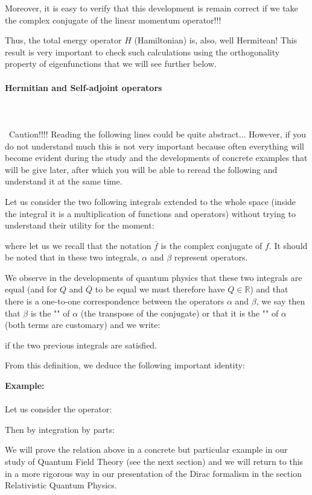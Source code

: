 	Moreover, it is easy to verify that this development is remain correct if we take the complex conjugate of the linear momentum operator!!!

	Thus, the total energy operator $H$ (Hamiltonian) is, also, well Hermitean! This result is very important to check such calculations using the orthogonality property of eigenfunctions that we will see further below.
	
	\paragraph{Hermitian and Self-adjoint operators}\mbox{}\\\\\
	Caution!!!! Reading the following lines could be quite abstract... However, if you do not understand much this is not very important because often everything will become evident during the study and the developments of concrete examples that will be give later, after which you will be able to reread the following and understand it at the same time.
	
	Let us consider the two following integrals extended to the whole space (inside the integral it is a multiplication of functions and operators) without trying to understand their utility for the moment:
	
	where let us we recall that the notation $\bar{f}$ is the complex conjugate of $f$. It should be noted that in these two integrals, $\alpha$ and $\beta$ represent operators.
	
	We observe in the developments of quantum physics that these two integrals are equal (and for $Q$ and $\bar{Q}$ to be equal we must therefore have $Q\in\mathbb{R}$) and that there is a one-to-one correspondence between the operators $\alpha$ and $\beta$, we say then that $\beta$ is the "" of $\alpha$ (the transpose of the conjugate) or that it is the "" of $\alpha$ (both terms are customary) and we write:
	
	if the two previous integrals are satisfied.

	From this definition, we deduce the following important identity:
	
	\begin{tcolorbox}[colframe=black,colback=white,sharp corners]
	\textbf{{\Large {}}Example:}\\\\
	Let us consider the operator:
	
	Then by integration by parts:
	
	\end{tcolorbox}
	\begin{tcolorbox}[title=Remark,colframe=black,arc=10pt]
	We will prove the relation above in a concrete but particular example in our study of Quantum Field Theory (see the next section) and we will return to this in a more rigorous way in our presentation of the Dirac formalism in the section Relativistic Quantum Physics.
	\end{tcolorbox}
	

